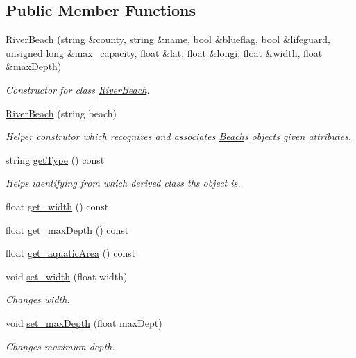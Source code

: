 \subsection*{Public Member Functions}
\begin{DoxyCompactItemize}
\item 
\hyperlink{class_river_beach_aa4964f12fe275b47b78fa5f1c52b0b32}{River\+Beach} (string \&county, string \&name, bool \&blueflag, bool \&lifeguard, unsigned long \&max\+\_\+capacity, float \&lat, float \&longi, float \&width, float \&max\+Depth)
\begin{DoxyCompactList}\small\item\em Constructor for class \hyperlink{class_river_beach}{River\+Beach}. \end{DoxyCompactList}\item 
\hyperlink{class_river_beach_a70e712f116a7cb499cd9f274dffaa308}{River\+Beach} (string beach)
\begin{DoxyCompactList}\small\item\em Helper construtor which recognizes and associates \hyperlink{class_beach}{Beach}\textquotesingle{}s object\textquotesingle{}s given attributes. \end{DoxyCompactList}\item 
string \hyperlink{class_river_beach_a07f48c077de96aca001f47ce06253f2f}{get\+Type} () const
\begin{DoxyCompactList}\small\item\em Helps identifying from which derived class ths object is. \end{DoxyCompactList}\item 
float \hyperlink{class_river_beach_a4fc528a34d80e3e2a6a48e53ab3e3f49}{get\+\_\+width} () const
\item 
float \hyperlink{class_river_beach_a0bb0a4f13ad1e2d7576d5ef641057e11}{get\+\_\+max\+Depth} () const
\item 
float \hyperlink{class_river_beach_a4bd144e5631968ed671051a203f1bce3}{get\+\_\+aquatic\+Area} () const
\item 
void \hyperlink{class_river_beach_a53697d96e65d8841e5979d3f5d79c9e3}{set\+\_\+width} (float width)
\begin{DoxyCompactList}\small\item\em Changes width. \end{DoxyCompactList}\item 
void \hyperlink{class_river_beach_a1118c334abeeae8352ecaf0f33059f6a}{set\+\_\+max\+Depth} (float max\+Dept)
\begin{DoxyCompactList}\small\item\em Changes maximum depth. \end{DoxyCompactList}\item 

\end{DoxyCompactItemize}
